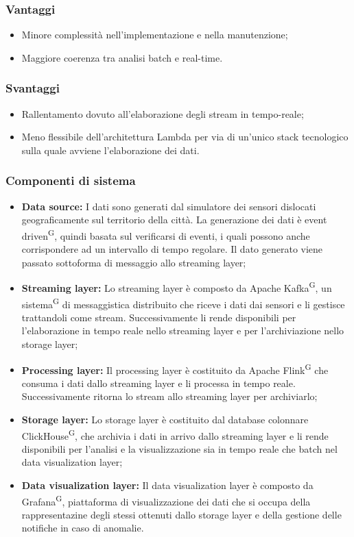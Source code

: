 \documentclass[8pt]{article}
\newcommand{\glossterm}[1]{#1\textsuperscript{G}} %
\begin{document}
\subsubsection{Vantaggi}
\begin{itemize}
    \item Minore complessità nell'implementazione e nella manutenzione;
    \item Maggiore coerenza tra analisi batch e real-time.
\end{itemize}
\subsubsection{Svantaggi}
\begin{itemize}
    \item Rallentamento dovuto all'elaborazione degli stream in tempo-reale;
    \item Meno flessibile dell'architettura Lambda per via di un'unico stack tecnologico sulla quale avviene l'elaborazione dei dati.
\end{itemize}
\subsubsection{Componenti di sistema}
\begin{itemize}
    \item \textbf{Data source:} I dati sono generati dal simulatore dei sensori dislocati geograficamente sul territorio della città. La generazione dei dati è \glossterm{event driven}, quindi basata sul verificarsi di eventi, i quali possono anche corrispondere ad un intervallo di tempo regolare. Il dato generato viene passato sottoforma di messaggio allo streaming layer; 
    \item \textbf{Streaming layer:} Lo streaming layer è composto da Apache \glossterm{Kafka}, un \glossterm{sistema} di messaggistica distribuito che riceve i dati dai sensori e li gestisce trattandoli come stream. Successivamente li rende disponibili per l’elaborazione in tempo reale nello streaming layer e per l'archiviazione nello storage layer; 
    \item \textbf{Processing layer:} Il processing layer è costituito da Apache \glossterm{Flink} che consuma i dati dallo streaming layer e li processa in tempo reale. Successivamente ritorna lo stream allo streaming layer per archiviarlo;
    \item \textbf{Storage layer:} Lo storage layer è costituito dal database colonnare \glossterm{ClickHouse}, che archivia i dati in arrivo dallo streaming layer e li rende disponibili per l’analisi e la visualizzazione sia in tempo reale che batch nel data visualization layer;
    \item \textbf{Data visualization layer:} Il data visualization layer è composto da \glossterm{Grafana}, piattaforma di visualizzazione dei dati che si occupa della rappresentazine degli stessi ottenuti dallo storage layer e della gestione delle notifiche in caso di anomalie.
\end{itemize}
\clearpage
\end{document}

